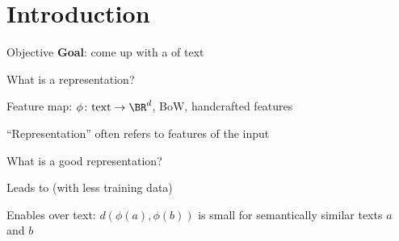\documentclass[usenames,dvipsnames,notes,11pt,aspectratio=169]{beamer}
\begin{document}

\section{Introduction}

\begin{frame}
    {Objective}    
    \textbf{Goal}: come up with a  of text\\
    \begin{wideitemize}[<+->]
        \item What is a representation?
            \begin{wideitemize}
                \item Feature map: $\phi\colon \text{text} \rightarrow \BR^d$, \eg BoW, handcrafted features
                \item ``Representation'' often refers to  features of the input
            \end{wideitemize}
        \item What is a good representation?
            \begin{wideitemize}
                \item Leads to  (with less training data)
                \item Enables  over text: 
                    $d(\phi(a), \phi(b))$ is small for semantically similar texts $a$ and $b$
            \end{wideitemize}
    \end{wideitemize}
\end{frame}
\end{document}
